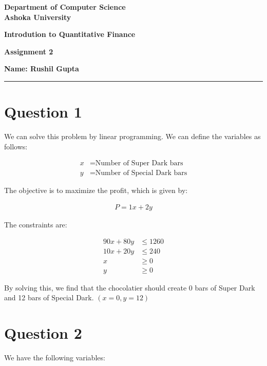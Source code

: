 \documentclass[a4paper]{article}
\begin{document}
\begin{center}
{\large \bf \color{red}  Department of Computer Science} \\
{\large \bf \color{red}  Ashoka University} \\

\vspace{0.1in}

{\large \bf \color{blue}  Introdution to Quantitative Finance}

\vspace{0.05in}

    { \bf \color{YellowOrange} Assignment 2}
\end{center}
\medskip

\hfill {\textbf{Name: Rushil Gupta} }

\bigskip
\hrule



\section*{Question 1}
We can solve this problem by linear programming. We can define the variables as follows:

\begin{align*}
    x &= \text{Number of Super Dark bars} \\
    y &= \text{Number of Special Dark bars}
\end{align*}

The objective is to maximize the profit, which is given by:

\begin{align*}
    P = 1x + 2y
\end{align*}

The constraints are:

\begin{align*}
    90x + 80y &\leq 1260 \\
    10x + 20y &\leq 240 \\
    x &\geq 0 \\
    y &\geq 0
\end{align*}

By solving this, we find that the chocolatier should create 0 bars of Super Dark and 12 bars of Special Dark. $(x = 0, y = 12)$

\vspace{10mm}
\section*{Question 2}
We have the following variables:
\end{document}
